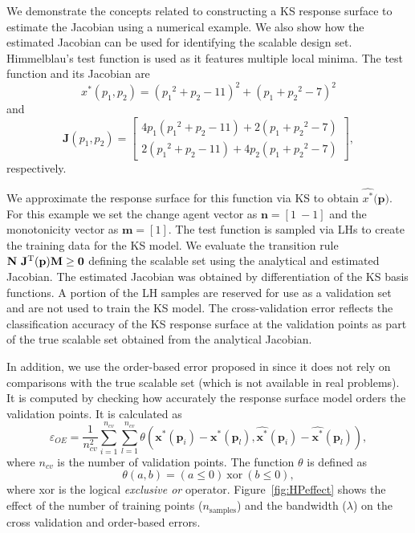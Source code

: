 We demonstrate the concepts related to constructing a \ac{KS} response surface to estimate the Jacobian using a numerical example. We also show how the estimated Jacobian can be used for identifying the scalable design set. Himmelblau's test function is used as it features multiple local minima. The test function and its Jacobian are
\begin{displaymath}
		{x}^*(p_1,p_2) = ({p_1}^{2}+{p_2}-11)^{2}+({p_1}+{p_2}^{2}-7)^{2} 
		\end{displaymath}
		and
	\begin{displaymath}	
		\mathbf{J}(p_1,p_2) = \begin{bmatrix}
			4{p_1}({p_1}^2 + {p_2} - 11) + 2({p_1} + {p_2}^2 -7) \\ 
			2({p_1}^2 + {p_2} - 11) + 4{p_2}({p_1} + {p_2}^2 -7) 
	\end{bmatrix},
	\end{displaymath}
	respectively.%

We approximate the response surface for this function via \ac{KS} to obtain $\hat{{x}^*}(\mathbf{p)}$. For this example we set the change agent vector as $\mathbf{n} = \left[1~-1\right]$ and the monotonicity vector as $\mathbf{m} = \left[1\right]$. The test function is sampled via \acp{LH} to create the training data for the \ac{KS} model. We evaluate the transition rule $\mathbf{N}~\mathbf{J}^{\text T}(\mathbf{p})\mathbf{M} \ge \mathbf{0}$ defining the scalable set using the analytical and estimated Jacobian. The estimated Jacobian was obtained by differentiation of the \ac{KS} basis functions. A portion of the \ac{LH} samples are reserved for use as a validation set and are not used to train the \ac{KS} model. The cross-validation error reflects the classification accuracy of the \ac{KS} response surface at the validation points as part of the true scalable set obtained from the analytical Jacobian.

In addition, we use the order-based error proposed in \cite{Audet2018} since it does not rely on comparisons with the true scalable set (which is not available in real problems). It is computed by checking how accurately the response surface model orders the validation points. It is calculated as 
%
\begin{equation}
    \label{eq:oeobjective}
	\varepsilon_{OE} = \frac{1}{n_{cv}^2} \sum_{i=1}^{n_{cv}} \sum_{l=1}^{n_{cv}} \theta\left(\mathbf{x}^*(\mathbf{p}_i) - \mathbf{x}^*(\mathbf{p}_l),\hat{\mathbf{x}^*}(\mathbf{p}_i) - \hat{\mathbf{x}^*}(\mathbf{p}_l)\right),
\end{equation}
%
where $n_{cv}$ is the number of validation points. The function $\theta$ is defined as
%
\begin{equation}
    \label{eq:theta}
    \theta\left(a,b\right) = \left(a \le 0\right)~\textrm{xor}~\left(b \le 0\right),
\end{equation}
%
where xor is the logical \textit{exclusive or} operator.
Figure~\ref{fig:HPeffect} shows the effect of the number of training points ($n_{\textrm{samples}}$) and the bandwidth ($\lambda$) on the cross validation and order-based errors.


